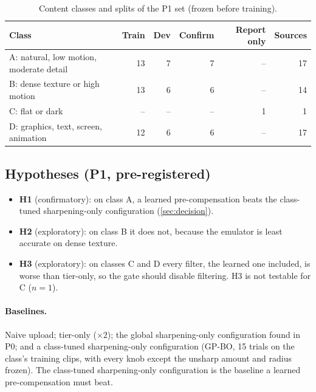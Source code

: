 \begin{table}[t]
  \centering
  \caption{Content classes and splits of the P1 set (frozen before training).}
  \label{tab:classes}
  \begin{tabular}{@{}lrrrrr@{}}
    \toprule
    Class & Train & Dev & Confirm & Report only & Sources \\
    \midrule
    A: natural, low motion, moderate detail & 13 & 7 & 7 & -- & 17 \\
    B: dense texture or high motion         & 13 & 6 & 6 & -- & 14 \\
    C: flat or dark                         & -- & -- & -- & 1 & 1 \\
    D: graphics, text, screen, animation    & 12 & 6 & 6 & -- & 17 \\
    \bottomrule
  \end{tabular}
\end{table}

\subsection{Hypotheses (P1, pre-registered)}

\begin{itemize}
  \item \textbf{H1} (confirmatory): on class A, a learned pre-compensation beats the class-tuned
        sharpening-only configuration (\cref{sec:decision}).
  \item \textbf{H2} (exploratory): on class B it does not, because the emulator is least accurate on
        dense texture.
  \item \textbf{H3} (exploratory): on classes C and D every filter, the learned one included, is worse
        than tier-only, so the gate should disable filtering. H3 is not testable for C ($n=1$).
\end{itemize}

\paragraph{Baselines.}
Naive upload; tier-only ($\times2$); the global sharpening-only configuration found in P0; and a
class-tuned sharpening-only configuration (GP-BO, 15 trials on the class's training clips, with every
knob except the unsharp amount and radius frozen). The class-tuned sharpening-only configuration is
the baseline a learned pre-compensation must beat.

